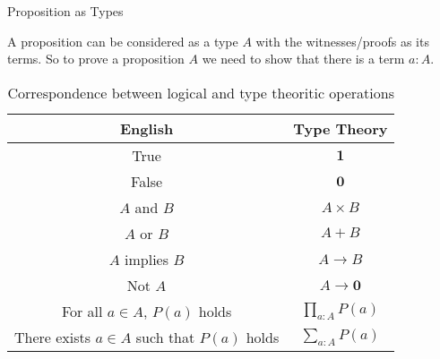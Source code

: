 \documentclass[10pt]{beamer}
\theoremstyle{definition}
\theoremstyle{definition}
\begin{document}

\begin{frame}{Proposition as Types}\label{prop as types}

\begin{block}{}
A proposition can be considered as a type $A$ with 
the witnesses/proofs as its terms. So to prove a proposition $A$ we need to show that 
there is a term $a : A$.
\end{block}

\begin{block}

\begin{table}
\caption{Correspondence between logical and type theoritic operations}
\begin{tabular}{ c | c }

\hline
English & Type Theory \\ 
\hline
 
True & $\mathbf{1}$ \\

False & $\mathbf{0}$ \\

$A$ and $B$ & $A \times B$ \\

$A$ or $B$ & $A + B$ \\

$A$ implies $B$ & $A \to B$ \\

Not $A$ & $A \to \mathbf{0}$ \\

For all $a\in A$, $P(a)$ holds & $ \prod_{a : A} P(a)$ \\ 

There exists $a\in A$ such that $P(a)$ holds & $\sum_{a : A} P(a)$ \\

\end{tabular}

\end{table}


\end{block}

\end{frame}


\end{document}
